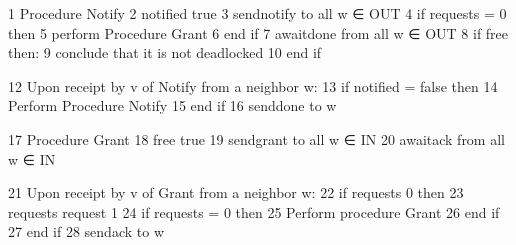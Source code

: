 \documentclass[letterpaper,10pt,english]{sphinxmanual}
\begin{document}
\def\sphinxLiteralBlockLabel{\label{\detokenize{docs/BrachaToueg/algorithm:id12}}\label{\detokenize{docs/BrachaToueg/algorithm:brachatouegdeadlockdetectionalgorithm}}}
\begin{sphinxVerbatim}[commandchars=\\\{\},numbers=left,firstnumber=1,stepnumber=1]
1   Procedure Notify
2   notified \PYGZlt{}\PYGZhy{} true
3   send\PYGZlt{}notify\PYGZgt{} to all w ∈  OUT
4   if requests = 0 then
    5           perform Procedure Grant
    6   end if
7   await\PYGZlt{}done\PYGZgt{} from all w ∈ OUT
8   if free then:
9        conclude that it is not deadlocked
10    end if

12   Upon receipt by v of Notify from a neighbor w:
13   if notified = false then
    14      Perform Procedure Notify
15  end if
16  send\PYGZlt{}done\PYGZgt{} to w

17  Procedure Grant
18  free \PYGZlt{}\PYGZhy{} true
19  send\PYGZlt{}grant\PYGZgt{} to all w ∈ IN
20  await\PYGZlt{}ack\PYGZgt{} from all w ∈ IN

21  Upon receipt by v of Grant from a neighbor w:
22  if requests \PYGZgt{} 0 then
    23          requests \PYGZlt{}\PYGZhy{} request \PYGZhy{} 1
24      if requests = 0 then
    25                  Perform procedure Grant
    26          end if
27  end if
28  send\PYGZlt{}ack\PYGZgt{} to w
\end{sphinxVerbatim}
\end{document}
